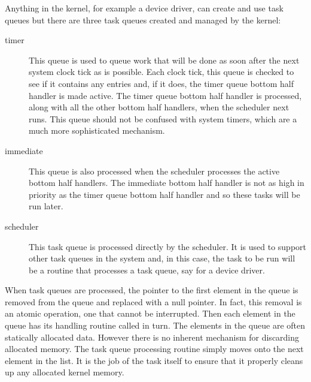 Anything in the kernel, for example a device driver, can create and use task
queues but there are three task queues created and managed by the kernel:
\begin{description}	
	\item [timer] This queue is used to queue work that will be done as soon after
		the next system clock tick as is possible.  Each clock tick, this queue
		is checked to see if it contains any entries and, if it does, the timer
		queue bottom half handler is made active.   The timer queue bottom half
		handler is processed, along with all the other bottom half handlers, 
		when the scheduler next runs. 
		This queue should not be confused with system timers, which are a much
		more sophisticated mechanism.
	\item [immediate] This queue is also processed when the scheduler processes the
		active bottom half handlers.  The immediate bottom half handler is not
		as high in priority as the timer queue bottom half handler and so these 
		tasks will be run later.
	\item [scheduler] This task queue is processed directly by the scheduler.
		It is used to support other task queues in the system and, in this case,
		the task to be run will be a routine that processes a task queue, say
		for a device driver.
\end{description}

When task queues are processed, the pointer to the first element in the queue is
removed from the queue and replaced with a null pointer.
In fact, this removal is an atomic operation, one that cannot be interrupted.
Then each element in the queue has its handling routine called in turn.
The elements in the queue are often statically allocated data.
However there is no inherent mechanism for discarding allocated memory.
The task queue processing routine simply moves onto the next element in the list.
It is the job of the task itself to ensure that it properly cleans up any allocated
kernel memory.

